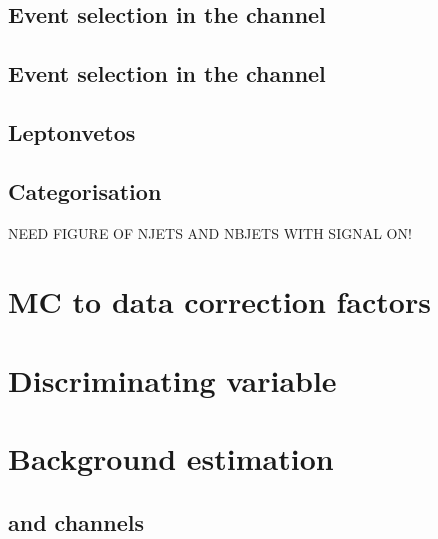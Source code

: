 \subsection{\texorpdfstring{Event selection in the \tautau channel}{Event selection in the tau tau channel}}
\label{sec:mssm_eventsel_tt}

\subsection{\texorpdfstring{Event selection in the \emu channel}{Event selection in the e mu channel}}
\label{sec:mssm_eventsel_em}

\subsection{Leptonvetos}
\label{sec:mssm_eventsel_leptonvetos}

\subsection{Categorisation}
\label{sec:mssm_eventsel_categories}

NEED FIGURE OF NJETS AND NBJETS WITH SIGNAL ON!

\section{\ac{MC} to data correction factors}
\label{sec:mssm_mccorrs}

\section{Discriminating variable}
\label{sec:mssm_discrvar}

\section{Background estimation}
\label{sec:mssm_bkgs}

\subsection{\texorpdfstring{\mutau and \etau channels}{mutau and etau channels}}
\label{sec:mssm_bkgs_mtet}

\subsubsection{\texorpdfstring{\Ztautau}{Z to tau tau}}
\label{sec:mssm_bkgs_mtet_ztt}


